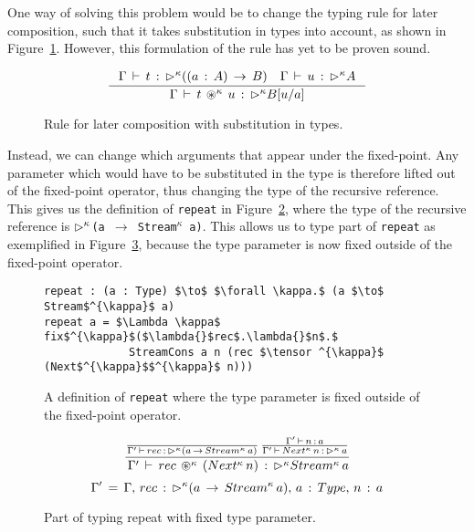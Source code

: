 One way of solving this problem would be to change the typing rule for later
composition, such that it takes substitution in types into account, as shown in
Figure~\ref{fig:tensor_with_subst}. However, this formulation of the rule has
yet to be proven sound.

\begin{figure}[h]
\[
\inference { \Gamma \, \vdash \, t\, :\, \later^{\kappa} ((a\, :\, A)\,
  \rightarrow \, B)\quad \Gamma \, \vdash \, u\, :\, \later^{\kappa} A }{
  \Gamma \, \vdash \, t\, \tensor ^{\kappa} \, u\, :\, \later^{\kappa} B[{ u
  }/{ a }] } 
\]
  \caption{Rule for later composition with substitution in types.}
  \label{fig:tensor_with_subst}
\end{figure}

Instead, we can change which arguments that appear under the fixed-point. Any
parameter which would have to be substituted in the type is therefore lifted out
of the fixed-point operator, 
thus changing the type of the recursive reference. This gives us
the definition of \texttt{repeat} in
Figure~\ref{fig:repeat_guarded_example_new}, where the type of the recursive
reference is \texttt{$\rhd ^{\kappa}$(a~$\rightarrow$~Stream$^{\kappa}$
  a)}. This allows us to type part of \texttt{repeat} as exemplified in
Figure~\ref{fig:repeat_typing_new}, because the type parameter is now fixed
outside of the fixed-point operator.

\begin{figure}[h]
  \begin{lstlisting}[mathescape]
repeat : (a : Type) $\to$ $\forall \kappa.$ (a $\to$ Stream$^{\kappa}$ a)
repeat a = $\Lambda \kappa$ fix$^{\kappa}$($\lambda{}$rec$.\lambda{}$n$.$ 
             StreamCons a n (rec $\tensor ^{\kappa}$ (Next$^{\kappa}$$^{\kappa}$ n)))
\end{lstlisting}
  \caption{A definition of \texttt{repeat} where the type parameter is fixed
    outside of the fixed-point operator.}
  \label{fig:repeat_guarded_example_new}
\end{figure}

\begin{figure}[h]
\[
\frac { \frac {  }{ \Gamma '\, \vdash \, rec\, :\, \rhd ^{\kappa}(a\, \rightarrow
    \, Stream^{\kappa}\, a) } \, \frac { \Gamma '\, \vdash \, n\, :\, a }{ \Gamma '\,
    \vdash \, Next^{\kappa}\, n\, :\, \rhd ^{\kappa}\, a }  }{ \, \Gamma '\, \vdash \, rec\,
  \circledast ^{\kappa} \, (Next^{\kappa}\, n)\, :\, \rhd ^{\kappa}Stream^{\kappa}\, a }
\]
\[
 \Gamma '\, =\, \Gamma ,\, rec\, :\, \rhd ^{\kappa}(a\, \rightarrow \, Stream^{\kappa}\,
 a),\, a\, :\, Type,\, n\, :\, a
\]

  \caption{Part of typing repeat with fixed type parameter.}
  \label{fig:repeat_typing_new}
\end{figure}

